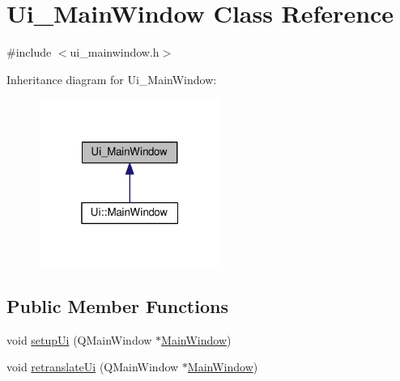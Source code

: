 \hypertarget{class_ui___main_window}{}\section{Ui\+\_\+\+Main\+Window Class Reference}
\label{class_ui___main_window}


{\ttfamily \#include $<$ui\+\_\+mainwindow.\+h$>$}



Inheritance diagram for Ui\+\_\+\+Main\+Window\+:
\nopagebreak
\begin{figure}[H]
\begin{center}
\leavevmode
\includegraphics[width=169pt]{class_ui___main_window__inherit__graph}
\end{center}
\end{figure}
\subsection*{Public Member Functions}
\begin{DoxyCompactItemize}
\item 
void \hyperlink{class_ui___main_window_acf4a0872c4c77d8f43a2ec66ed849b58}{setup\+Ui} (Q\+Main\+Window $\ast$\hyperlink{class_main_window}{Main\+Window})
\item 
void \hyperlink{class_ui___main_window_a097dd160c3534a204904cb374412c618}{retranslate\+Ui} (Q\+Main\+Window $\ast$\hyperlink{class_main_window}{Main\+Window})
\end{DoxyCompactItemize}
